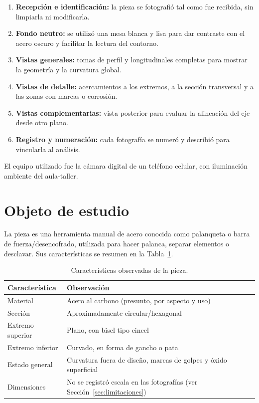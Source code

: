 \documentclass[runningheads]{llncs}
\begin{document}
\begin{enumerate}
\item \textbf{Recepción e identificación:} la pieza se fotografió tal como fue recibida, sin limpiarla ni modificarla.
\item \textbf{Fondo neutro:} se utilizó una mesa blanca y lisa para dar contraste con el acero oscuro y facilitar la lectura del contorno.
\item \textbf{Vistas generales:} tomas de perfil y longitudinales completas para mostrar la geometría y la curvatura global.
\item \textbf{Vistas de detalle:} acercamientos a los extremos, a la sección transversal y a las zonas con marcas o corrosión.
\item \textbf{Vistas complementarias:} vista posterior para evaluar la alineación del eje desde otro plano.
\item \textbf{Registro y numeración:} cada fotografía se numeró y describió para vincularla al análisis.
\end{enumerate}

El equipo utilizado fue la cámara digital de un teléfono celular, con iluminación ambiente del aula-taller.

\section{Objeto de estudio}

La pieza es una herramienta manual de acero conocida como palanqueta o barra de fuerza/desencofrado, utilizada para hacer palanca, separar elementos o desclavar. Sus características se resumen en la Tabla~\ref{tab:pieza}.

\begin{table}
\caption{Características observadas de la pieza.}\label{tab:pieza}
\centering
\begin{tabular}{|p{3.2cm}|p{7.5cm}|}
\hline
\textbf{Característica} & \textbf{Observación}\\
\hline
Material & Acero al carbono (presunto, por aspecto y uso)\\
Sección & Aproximadamente circular/hexagonal\\
Extremo superior & Plano, con bisel tipo cincel\\
Extremo inferior & Curvado, en forma de gancho o pata\\
Estado general & Curvatura fuera de diseño, marcas de golpes y óxido superficial\\
Dimensiones & No se registró escala en las fotografías (ver Sección~\ref{sec:limitaciones})\\
\hline
\end{tabular}
\end{table}
\end{document}
